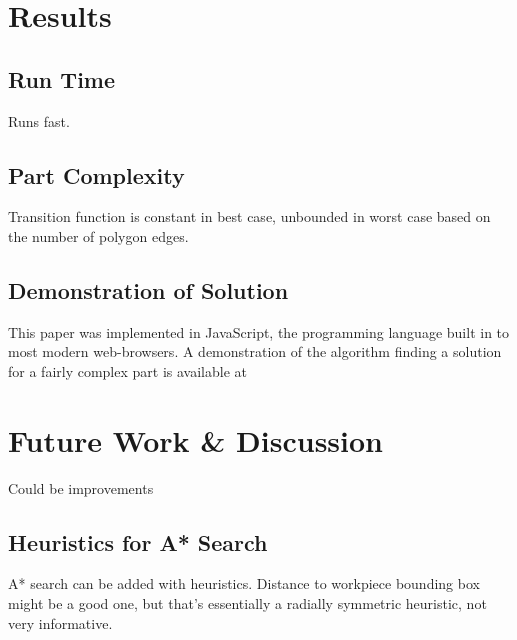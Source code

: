 \section{Results}

	\subsection{Run Time}

Runs fast.

	\subsection{Part Complexity}

Transition function is constant in best case, unbounded in worst case based on the number of polygon edges.

	\subsection{Demonstration of Solution}

This paper was implemented in JavaScript, the programming language built in to most modern web-browsers. A demonstration of the algorithm finding a solution for a fairly complex part is available at 



\section{Future Work \& Discussion}

Could be improvements

	\subsection{Heuristics for A* Search}

A* search can be added with heuristics. Distance to workpiece bounding box might be a good one, but that's essentially a radially symmetric heuristic, not very informative.
